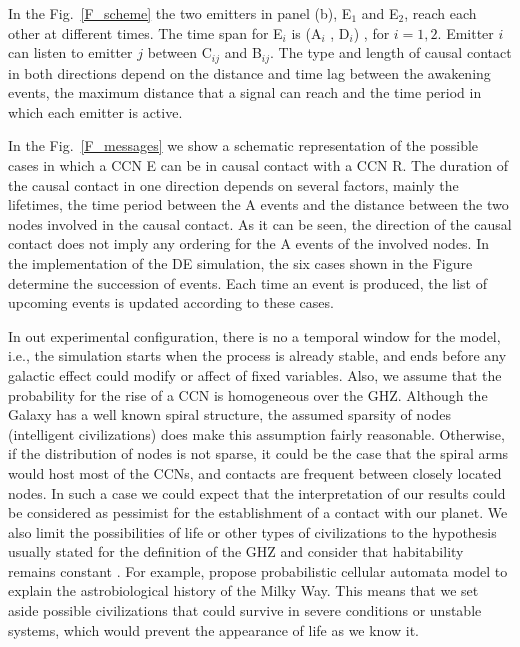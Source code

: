 \documentclass[crop]{CSLB}
\newcommand{\ceti}{CCN}
\newcommand{\cetis}{CCNs}
\newcommand{\ffn}[1]{}
\begin{document}
%
In the Fig.~\ref{F_scheme} the two
emitters in panel (b), E$_1$ and E$_2$, reach each other at different times.
%
The time span for E$_i$ is (A$_i$ , D$_i$) , for $i = {1, 2}$.
%
Emitter $i$ can listen to emitter $j$ between C$_{ij}$ and B$_{ij}$.
%
The type and length of causal contact in both directions depend on the
distance and time lag between the awakening events, the maximum
distance that a signal can reach and the time period in which each
emitter is active.
%
\ffn{2}
%
In the Fig.~\ref{F_messages} we show a schematic representation of the
possible cases in which a \ceti{} E can be in causal contact with a
\ceti{} R.
%
The duration of the causal contact in one direction depends on several
factors, mainly the lifetimes, the time period between the A events
and the distance between the two nodes involved in the causal
contact.
%
As it can be seen, the direction of the causal contact does not imply
any ordering for the A events of the involved nodes.
%
In the implementation of the DE simulation, the six cases shown in the
Figure determine the succession of events.
%
Each time an event is produced, the list of upcoming events is updated
according to these cases.




 


In out experimental configuration, there is no a temporal window for
the model, i.e., the simulation starts when the process is already
stable, and ends before any galactic effect could modify or affect of
fixed variables.
%
Also, we assume that the probability for the rise of a \ceti{} is
homogeneous over the GHZ.
%
Although the Galaxy has a well known spiral structure, the assumed
sparsity of nodes (intelligent civilizations) does make this
assumption fairly reasonable.
%
Otherwise, if the distribution of nodes is not sparse, it could be the
case that the spiral arms would host most of the \cetis{}, and
contacts are frequent between closely located nodes.
%
In such a case we could expect that the interpretation of our results
could be considered as pessimist for the establishment of a contact
with our planet.
%
We also limit the possibilities of life or other types of
civilizations to the hypothesis usually stated for the definition of
the GHZ \citep{dayal_habitability_2016, gonzalez_galactic_2001,
lineweaver_galactic_2004, gonzalez_habitable_2005,
morrison_extending_2015, haqq-misra_evolution_2019,
rahvar_cosmic_2016, gobat_evolution_2016, rahvar_cosmic_2016} and
consider that habitability remains constant \citep[see, however,
][]{gonzalez_habitable_2005, dayal_habitability_2016, gobat_evolution_2016}.
%
For example, \citet{vukotic_astrobiological_2012} propose
probabilistic cellular automata model to explain the astrobiological
history of the Milky Way.
%
This means that we set aside possible civilizations that could survive
in severe conditions or unstable systems, which would prevent the
appearance of life as we know it.
\end{document}

